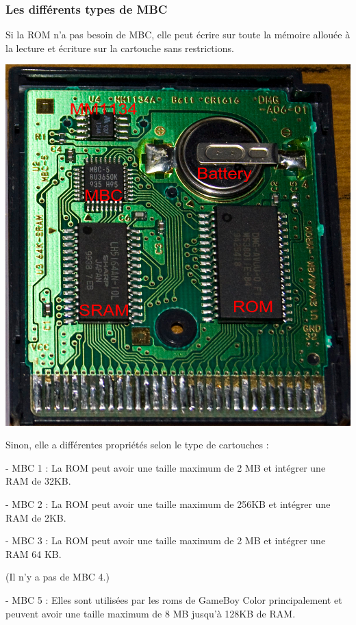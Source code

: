 \documentclass[12pt, a4paper]{article}
\begin{document}
\bigskip
\pagebreak

\subsubsection{Les différents types de MBC}

Si la ROM n'a pas besoin de MBC, elle peut écrire sur toute la mémoire allouée à la lecture et écriture sur la cartouche sans restrictions. 

\begin{center}
\includegraphics[width = 10.4 cm]{MBCinside.jpg}
\end{center}

Sinon, elle a différentes propriétés selon le type de cartouches :

\bigskip

- MBC 1 : La ROM peut avoir une taille maximum de 2 MB et intégrer une RAM de 32KB.

\bigskip

- MBC 2 : La ROM peut avoir une taille maximum de 256KB et intégrer une RAM de 2KB.

\bigskip

- MBC 3 : La ROM peut avoir une taille maximum de 2 MB et intégrer une RAM 64 KB.


\bigskip

(Il n'y a pas de MBC 4.)

\bigskip

- MBC 5 :  Elles sont utilisées par les roms de GameBoy Color principalement et peuvent avoir une taille maximum de 8 MB jusqu'à 128KB de RAM.
\end{document}
